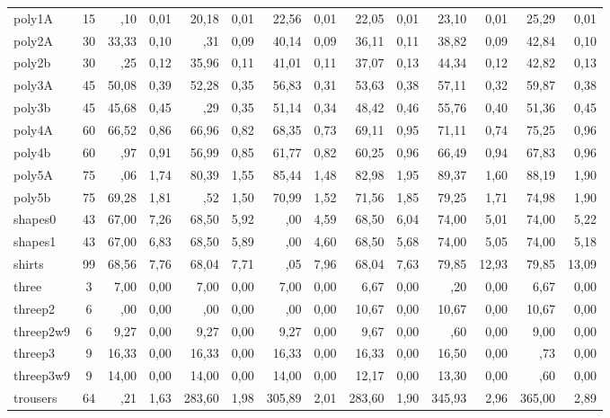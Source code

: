 \begin{adjustwidth}{-2cm}{-2.5 cm}
\begin{threeparttable}
{\begin{tabular}{|l|c|rr|rr|rr|rr|rr|rr|}
            poly1A &15  &\lgray18,10 &0,01  &20,18 &0,01  &22,56 &0,01  &22,05 &0,01  &23,10 &0,01  &25,29 &0,01 \\
            poly2A &30  &33,33 &0,10  &\lgray32,31 &0,09  &40,14 &0,09  &36,11 &0,11  &38,82 &0,09  &42,84 &0,10 \\
            poly2b &30  &\lgray35,25 &0,12  &35,96 &0,11  &41,01 &0,11  &37,07 &0,13  &44,34 &0,12  &42,82 &0,13 \\
            poly3A &45  &50,08 &0,39  &52,28 &0,35  &56,83 &0,31  &53,63 &0,38  &57,11 &0,32  &59,87 &0,38 \\
            poly3b &45  &45,68 &0,45  &\lgray45,29 &0,35  &51,14 &0,34  &48,42 &0,46  &55,76 &0,40  &51,36 &0,45 \\
            poly4A &60  &66,52 &0,86  &66,96 &0,82  &68,35 &0,73  &69,11 &0,95  &71,11 &0,74  &75,25 &0,96 \\
            poly4b &60  &\lgray55,97 &0,91  &56,99 &0,85  &61,77 &0,82  &60,25 &0,96  &66,49 &0,94  &67,83 &0,96 \\
            poly5A &75  &\lgray80,06 &1,74  &80,39 &1,55  &85,44 &1,48  &82,98 &1,95  &89,37 &1,60  &88,19 &1,90 \\
            poly5b &75  &69,28 &1,81  &\lgray67,52 &1,50  &70,99 &1,52  &71,56 &1,85  &79,25 &1,71  &74,98 &1,90 \\
            shapes0 &43  &67,00 &7,26  &68,50 &5,92  &\lgray66,00 &4,59  &68,50 &6,04  &74,00 &5,01  &74,00 &5,22 \\
            shapes1 &43  &67,00 &6,83  &68,50 &5,89  &\lgray66,00 &4,60  &68,50 &5,68  &74,00 &5,05  &74,00 &5,18 \\
            shirts &99  &68,56 &7,76  &68,04 &7,71  &\lgray67,05 &7,96  &68,04 &7,63  &79,85 &12,93  &79,85 &13,09 \\
            three &3  &7,00 &0,00  &7,00 &0,00  &7,00 &0,00  &6,67 &0,00  &\lgray6,20 &0,00  &6,67 &0,00 \\
            threep2 &6  &\lgray10,00 &0,00  &\lgray10,00 &0,00  &\lgray10,00 &0,00  &10,67 &0,00  &10,67 &0,00  &10,67 &0,00 \\
            threep2w9 &6  &9,27 &0,00  &9,27 &0,00  &9,27 &0,00  &9,67 &0,00  &\lgray8,60 &0,00  &9,00 &0,00 \\
            threep3 &9  &16,33 &0,00  &16,33 &0,00  &16,33 &0,00  &16,33 &0,00  &16,50 &0,00  &\lgray15,73 &0,00 \\
            threep3w9 &9  &14,00 &0,00  &14,00 &0,00  &14,00 &0,00  &12,17 &0,00  &13,30 &0,00  &\lgray11,60 &0,00 \\
            trousers &64  &\lgray281,21 &1,63  &283,60 &1,98  &305,89 &2,01  &283,60 &1,90  &345,93 &2,96  &365,00 &2,89 \\
            \hline
        \end{tabular}
    }
    \label{tab:t1}
\end{threeparttable}\end{adjustwidth}



